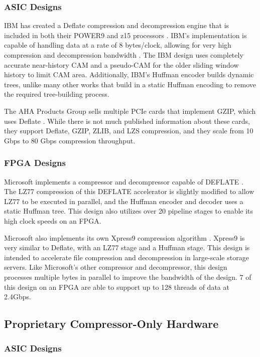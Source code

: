 \documentclass[doublespace,draft,nopageskip]{VTthesis} %
\begin{document}
\subsubsection{ASIC Designs}\label{sss:asic_designs}
IBM has created a Deflate compression and decompression engine that is included in both their POWER9 and z15 processors \cite{ibm}. IBM's implementation is capable of handling data at a rate of 8 bytes/clock, allowing for very high compression and decompression bandwidth \cite{ibm}. The IBM design uses completely accurate near-history CAM and a pseudo-CAM for the older sliding window history to limit CAM area. Additionally, IBM's Huffman encoder builds dynamic trees, unlike many other works that build in a static Huffman encoding to remove the required tree-building process.

The AHA Products Group sells multiple PCIe cards that implement GZIP, which uses Deflate \cite{aha}. While there is not much published information about these cards, they support Deflate, GZIP, ZLIB, and LZS compression, and they scale from 10 Gbps to 80 Gbps compression throughput.

\subsubsection{FPGA Designs}\label{sss:fpga_designs}

Microsoft implements a compressor and decompressor capable of DEFLATE \cite{microsoft}. The LZ77 compression of this DEFLATE accelerator is slightly modified to allow LZ77 to be executed in parallel, and the Huffman encoder and decoder uses a static Huffman tree. This design also utilizes over 20 pipeline stages to enable its high clock speeds on an FPGA.

Microsoft also implements its own Xpress9 compression algorithm \cite{xpress9}. Xpress9 is very similar to Deflate, with an LZ77 stage and a Huffman stage. This design is intended to accelerate file compression and decompression in large-scale storage servers. Like Microsoft's other compressor and decompressor, this design processes multiple bytes in parallel to improve the bandwidth of the design. 7 of this design on an FPGA are able to support up to 128 threads of data at 2.4Gbps.

\subsection{Proprietary Compressor-Only Hardware}\label{proprietary_compressor-only_hardware}
\subsubsection{ASIC Designs}\label{sss:asic_designs}
\end{document}
